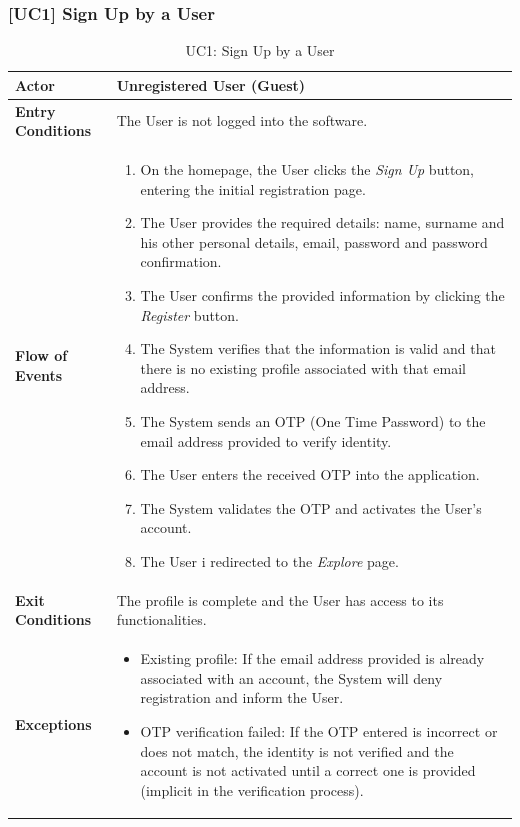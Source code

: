 \subsubsection*{[UC1] Sign Up by a User}
\begin{table}[H]
    \sf
    \small
    \centering
    \renewcommand{\arraystretch}{1.5}
    \begin{tabularx}{\textwidth}{|l|X|}
        \hline
        \cellcolor{lightgray} \textbf{Actor} & Unregistered User (Guest) \\
        \hline
        \cellcolor{lightgray} \textbf{Entry Conditions} & The User is not logged into the software. \\
        \hline
        \cellcolor{lightgray} \textbf{Flow of Events} & 
        \begin{enumerate}[leftmargin=*, before=\vspace*{-\baselineskip}]
            \item On the homepage, the User clicks the \emph{Sign Up} button, entering the initial registration page.
            \item The User provides the required details: name, surname and his other personal details, email, password and password confirmation.
            \item The User confirms the provided information by clicking the \emph{Register} button.
            \item The System verifies that the information is valid and that there is no existing profile associated with that email address.
            \item The System sends an OTP (One Time Password) to the email address provided to verify identity.
            \item The User enters the received OTP into the application.
            \item The System validates the OTP and activates the User's account.
            \item The User i redirected to the \emph{Explore} page.
        \end{enumerate}
        \\ 
        \hline
        \cellcolor{lightgray} \textbf{Exit Conditions} & The profile is complete and the User has access to its functionalities. \\
        \hline
        \cellcolor{lightgray} \textbf{Exceptions} & 
        \begin{itemize}[leftmargin=*, before=\vspace*{-\baselineskip}]
            \item Existing profile: If the email address provided is already associated with an account, the System will deny registration and inform the User.
            \item OTP verification failed: If the OTP entered is incorrect or does not match, the identity is not verified and the account is not activated until a correct one is provided (implicit in the verification process).
        \end{itemize}
        \\ 
        \hline
    \end{tabularx}
    \caption{UC1: Sign Up by a User}
\end{table}
